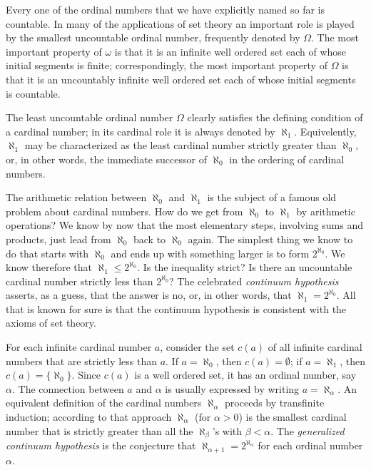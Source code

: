 Every one of the ordinal numbers that we have explicitly named so far is countable. In many of the applications of set theory an important role is played by the smallest uncountable ordinal number, frequently denoted by $\Omega$. The most important property of $\omega$ is that it is an infinite well ordered set each of whose initial segments is finite; correspondingly, the most important property of $\Omega$ is that it is an uncountably infinite well ordered set each of whose initial segments is countable. 

The least uncountable ordinal number $\Omega$ clearly  satisfies the defining condition of a cardinal number; in its cardinal role it is always denoted by $\aleph_{1}$. Equivelently, $\aleph_{1}$ may be characterized as the least cardinal number strictly greater than $\aleph_{0}$, or, in other words, the immediate successor of $\aleph_{0}$ in the ordering of cardinal numbers. 

The arithmetic relation between $\aleph_{0}$ and $\aleph_{1}$ is the subject of a famous old problem about cardinal numbers. How do we get from $\aleph_{0}$ to $\aleph_{1}$ by arithmetic operations? We know by now that the most elementary steps, involving sums and products, just lead from $\aleph_{0}$ back to $\aleph_{0}$ again. The simplest thing we know to do that starts with $\aleph_{0}$ and ends up with something larger is to form $2^{\aleph_{0}}$. We know therefore that $\aleph_{1} \le 2^{\aleph_{0}}$. Is the inequality strict? Is there an uncountable cardinal number strictly less than $2^{\aleph_{0}}$? The celebrated \textit{continuum hypothesis} asserts, as a guess, that the answer is no, or, in other words, that $\aleph_{1} = 2^{\aleph_{0}}$. All that is known for sure is that the continuum hypothesis is consistent with the axioms of set theory. 

For each infinite cardinal number $a$, consider the set $c(a)$ of all infinite cardinal numbers that are strictly less than $a$. If $a = \aleph_{0}$, then $c(a) = \emptyset$; if $a = \aleph_{1}$, then $c(a) = \{ \aleph_{0} \}$. Since $c(a)$ is a well ordered set, it has an ordinal number, say $\alpha$. The connection between $a$ and $\alpha$ is usually expressed by writing $a = \aleph_{\alpha}$. An equivalent definition of the cardinal numbers $\aleph_{\alpha}$ proceeds by transfinite induction; according to that approach $\aleph_{\alpha}$ (for $\alpha > 0$) is the smallest cardinal number that is strictly greater than all the $\aleph_{\beta}$'s with $\beta < \alpha$. The \textit{generalized continuum hypothesis} is the conjecture that $\aleph_{\alpha + 1} = 2^{\aleph_{\alpha}}$ for each ordinal number $\alpha$.